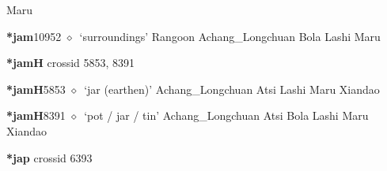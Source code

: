 \begin{list}{}{\leftmargin=1.5em \itemindent=-1.5em}
\hspace{1ex}
         Maru 
  \item {\footnotesize \textbf{*jam}}{\tiny 10952}
\hspace{1ex}
         $\diamond$~`surroundings'
         Rangoon 
\hspace{1ex}
         Achang\_Longchuan 
\hspace{1ex}
         Bola 
\hspace{1ex}
         Lashi 
\hspace{1ex}
         Maru 
  \end{list}
\item
\textbf{*jamH}
  {\tiny crossid 5853, 8391}
  \begin{list}{}{\leftmargin=1.5em \itemindent=-1.5em}
  \item {\footnotesize \textbf{*jamH}}{\tiny 5853}
         $\diamond$~`jar (earthen)'
         Achang\_Longchuan 
\hspace{1ex}
         Atsi 
\hspace{1ex}
         Lashi 
\hspace{1ex}
         Maru 
\hspace{1ex}
         Xiandao 
  \item {\footnotesize \textbf{*jamH}}{\tiny 8391}
\hspace{1ex}
         $\diamond$~`pot / jar / tin'
         Achang\_Longchuan 
\hspace{1ex}
         Atsi 
\hspace{1ex}
         Bola 
\hspace{1ex}
         Lashi 
\hspace{1ex}
         Maru 
\hspace{1ex}
         Xiandao 
  \end{list}
\item
\textbf{*jap}
  {\tiny crossid 6393}
